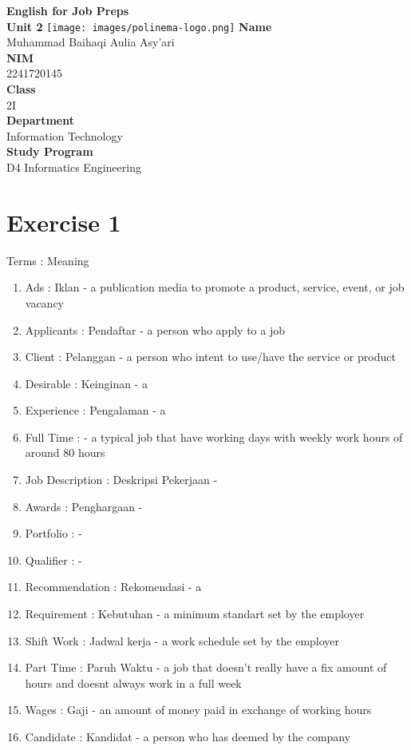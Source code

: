 \documentclass[12pt,titlepage]{article}
\newcommand{\vSubject}{English for Job Preps}
\newcommand{\vSubtitle}{Unit 2}
\newcommand{\vName}{Muhammad Baihaqi Aulia Asy'ari}
\newcommand{\vNIM}{2241720145}
\newcommand{\vClass}{2I}
\newcommand{\vDepartment}{Information Technology}
\newcommand{\vStudyProgram}{D4 Informatics Engineering}
\begin{document}
\begin{titlepage}
    \centering
    \vfill
    {\bfseries\LARGE
        \vSubject\\
        \vskip0.25cm
        \vSubtitle
    }
    \vfill
    \texttt{[image: images/polinema-logo.png]}
    \vfill
    {
        \textbf{Name}\\
        \vName\\
        \vskip0.5cm
        \textbf{NIM}\\
        \vNIM\\
        \vskip0.5cm
        \textbf{Class}\\
        \vClass\\
        \vskip0.5cm
        \textbf{Department}\\
        \vDepartment\\
        \vskip0.5cm
        \textbf{Study Program}\\
        \vStudyProgram
    }
\end{titlepage}

\newpage

\section*{Exercise 1}
Terms : Meaning
\begin{enumerate}
    \item Ads : Iklan - a publication media to promote a product, service, event, or job vacancy
    \item Applicants : Pendaftar - a person who apply to a job
    \item Client : Pelanggan - a person who intent to use/have the service or product 
    \item Desirable : Keinginan - a 
    \item Experience : Pengalaman - a 
    \item Full Time : - a typical job that have working days with weekly work hours of around 80 hours
    \item Job Description : Deskripsi Pekerjaan - 
    \item Awards : Penghargaan - 
    \item Portfolio : -
    \item Qualifier : -
    \item Recommendation : Rekomendasi - a 
    \item Requirement : Kebutuhan - a minimum standart set by the employer
    \item Shift Work : Jadwal kerja - a work schedule set by the employer
    \item Part Time : Paruh Waktu - a job that doesn't really have a fix amount of hours and doesnt always work in a full week
    \item Wages : Gaji - an amount of money paid in exchange of working hours
    \item Candidate : Kandidat - a person who has deemed by the company
\end{enumerate}
\end{document}
